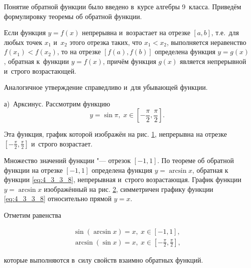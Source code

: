 
Понятие обратной функции было введено в~курсе алгебры 9~класса.
Приведём формулировку теоремы об обратной функции.

\begin{Th}\label{th:4_3_3_1}
Если функция $y = f(x)$ непрерывна и~возрастает на отрезке $[a,b]$,
т.е.\ для любых точек $x_{1}$ и~$x_{2}$ этого отрезка таких, что $x_{1} < x_{2}$,
выполняется неравенство $f(x_{1}) < f(x_{2})$, то на отрезке $\left[ f(a), f(b) \right]$
определена функция $y = g(x)$, обратная к~функции $y = f(x)$, причём функция $g(x)$
является непрерывной и~строго возрастающей.

Аналогичное утверждение справедливо и~для убывающей функции.
\end{Th}

а)~Арксинус.\label{lst:4_3_3_1} Рассмотрим функцию
\begin{equation}\label{eq:4_3_3_8}
\displaystyle y = \sin \pi, \; x \in \left[ -\frac{\pi}{2}, \frac{\pi}{2} \right].
\end{equation}

\noindent
Эта функция, график которой изображён на рис. \ref{fig:4_3_3_11},
непрерывна на отрезке $\displaystyle \left[ -\frac{\pi}{2}, \frac{\pi}{2} \right]$
и~строго возрастает.

\begin{figure}\label{fig:4_3_3_11}
\end{figure}

Множество значений функции "--- отрезок $[-1, 1]$.
По теореме об обратной функции на отрезке $[-1, 1]$ определена функция $y = \arcsin x$,
обратная к функции \eqref{eq:4_3_3_8}, непрерывная и~строго возрастающая.
График функции $y = \arcsin x$ изображённый на рис. \ref{fig:4_3_3_12},
симметричен графику функции \eqref{eq:4_3_3_8} относительно прямой $y = x$.

\begin{figure}\label{fig:4_3_3_12}
\end{figure}

Отметим равенства

\begin{gather}\label{eq:4_3_3_9}
\sin (\arcsin x) = x, \; x \in [-1, 1], \\
\displaystyle \arcsin (\sin x) = x, \; x \in \left[ -\frac{\pi}{2}, \frac{\pi}{2} \right],
\end{gather}

\noindent
которые выполняются в~силу свойств взаимно обратных функций.

